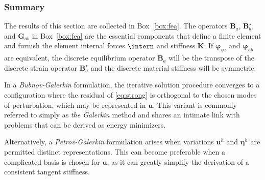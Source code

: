 \subsubsection{Summary}

  The results of this section are collected in Box~\ref{box:fea}.
  The operators \(\bm{B}_a\),     \(\bm{B}^\star_b\), and \(\bm{G}_{ab}\) 
  in Box~\ref{box:fea} are the essential components that define a finite element and furnish the element internal forces \(\intern\) and stiffness \(\mathbf{K}\).
  If \(\bm{\varphi}_{\eta a}\) and \(\bm{\varphi}_{u b}\) are
  equivalent, the discrete equilibrium operator \(\bm{B}_a\) 
  will be the transpose of the
  discrete strain operator \(\bm{B}^\star_a\)
  and the discrete material stiffness will be 
  symmetric.

  In a \emph{Bubnov-Galerkin} formulation, the iterative solution procedure
  converges to a configuration where the residual of \eqref{eq:strong}
  is orthogonal to the chosen modes of perturbation, which may be represented in
  \(\bm{u}\).
  This variant is
  commonly referred to simply as \emph{the Galerkin} method and shares
  an intimate link with problems that can be derived as energy
  minimizers.

  Alternatively, a \emph{Petrov-Galerkin} formulation arises when
  variations \(\bm{u}^h\) and \(\bm{\eta}^h\) are permitted distinct
  representations. This can become preferable when a complicated basis
  is chosen for \(\bm{u}\), as it can greatly simplify the derivation of
  a consistent tangent stiffness.

